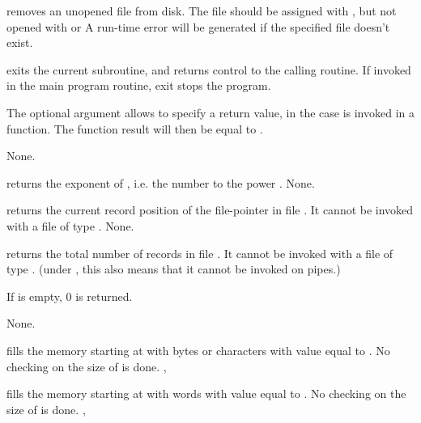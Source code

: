 \documentclass{report}
\begin{document}


{ removes an unopened file from disk. The file should be
assigned with , but not opened with  or }
{A run-time error will be generated if the specified file doesn't exist.}
{}



{ exits the current subroutine, and returns control to the calling
routine. If invoked in the main program routine, exit stops the program.

The optional argument  allows to specify a return value, in the case
 is invoked in a function. The function result will then be
equal to .}
{None.}
{}



{ returns the exponent of , i.e. the number  to the
power .}
{None.}{}



{ returns the current record position of the file-pointer in file
. It cannot be invoked with a file of type .}
{None.}
{}



{ returns the total number of records in file . 
It cannot be invoked with a file of type . (under \linux, this
also means that it cannot be invoked on pipes.)

If  is empty, 0 is returned.
}
{None.}
{}



{ fills the memory starting at  with  bytes
or characters with value equal to .
}
{No checking on the size of  is done.}
{, }



{ fills the memory starting at  with  words
with value equal to .
}
{No checking on the size of  is done.}
{, }
\end{document}
